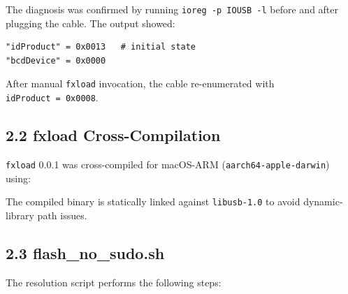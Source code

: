 The diagnosis was confirmed by running
\texttt{ioreg\ -p\ IOUSB\ -l} before and after
plugging the cable. The output showed:

\begin{verbatim}
"idProduct" = 0x0013   # initial state
"bcdDevice" = 0x0000
\end{verbatim}

After manual \texttt{fxload} invocation, the cable
re-enumerated with \texttt{idProduct\ =\ 0x0008}.

\subsection{2.2 fxload
Cross-Compilation}\label{fa_33:fxload-cross-compilation}

\texttt{fxload} 0.0.1 was cross-compiled for
macOS-ARM (\texttt{aarch64-apple-darwin}) using:

\begin{Shaded}
\begin{Highlighting}[]
 \OperatorTok{=}
 \KeywordTok{\&\&} 
\end{Highlighting}
\end{Shaded}

The compiled binary is statically linked against
\texttt{libusb-1.0} to avoid dynamic-library path
issues.

\subsection{2.3
flash\_no\_sudo.sh}\label{fa_33:flash_no_sudo.sh}

The resolution script performs the following
steps:

